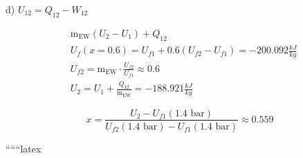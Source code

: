 d) \( U_{12} = Q_{12} - W_{12} \)

\[
\begin{aligned}
    &\text{m}_{\text{EW}} (U_2 - U_1) + Q_{12} \\
    &U_f (x = 0.6) = U_{f1} + 0.6 (U_{f2} - U_{f1}) = -200.092 \frac{kJ}{kg} \\
    &U_{f2} = \text{m}_{\text{EW}} \cdot \frac{U_{f2}}{U_{f1}} \approx 0.6 \\
    &U_2 = U_1 + \frac{Q_{12}}{\text{m}_{\text{EW}}} = -188.921 \frac{kJ}{kg}
\end{aligned}
\]

\[
x = \frac{U_2 - U_{f1} (1.4 \text{ bar})}{U_{f2} (1.4 \text{ bar}) - U_{f1} (1.4 \text{ bar})} \approx 0.559
\]

``````latex